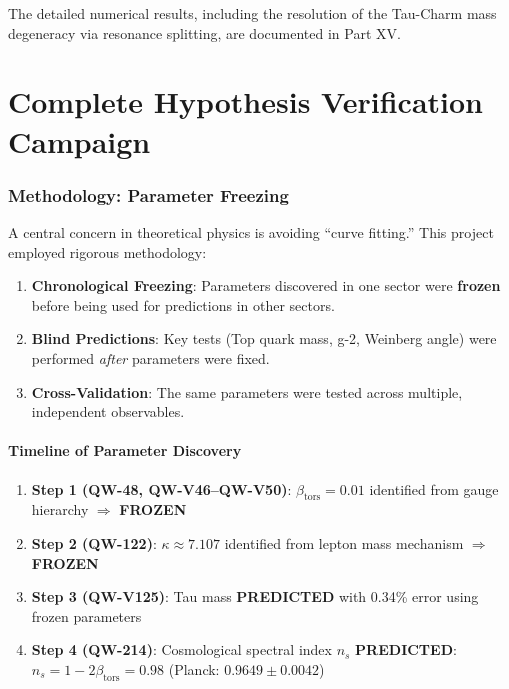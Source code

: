 \documentclass[11pt,a4paper]{book}
\theoremstyle{remark}
\newcommand{\betators}{\beta_{\text{tors}}}
\newcommand{\QW}[1]{\textbf{QW-#1}}
\begin{document}
The detailed numerical results, including the resolution of the Tau-Charm mass degeneracy via resonance splitting, are documented in Part XV.

\newpage
\part{Complete Hypothesis Verification Campaign}

\section{Methodology: Parameter Freezing}

A central concern in theoretical physics is avoiding ``curve fitting.'' This project employed rigorous methodology:

\begin{enumerate}
    \item \textbf{Chronological Freezing}: Parameters discovered in one sector were \textbf{frozen} before being used for predictions in other sectors.
    
    \item \textbf{Blind Predictions}: Key tests (Top quark mass, g-2, Weinberg angle) were performed \textit{after} parameters were fixed.
    
    \item \textbf{Cross-Validation}: The same parameters were tested across multiple, independent observables.
\end{enumerate}

\subsection{Timeline of Parameter Discovery}

\begin{enumerate}
    \item \textbf{Step 1 (\QW{48}, \QW{V46}--\QW{V50})}: $\betators = 0.01$ identified from gauge hierarchy $\Rightarrow$ \textbf{FROZEN}
    
    \item \textbf{Step 2 (\QW{122})}: $\kappa \approx 7.107$ identified from lepton mass mechanism $\Rightarrow$ \textbf{FROZEN}
    
    \item \textbf{Step 3 (\QW{V125})}: Tau mass \textbf{PREDICTED} with 0.34\% error using frozen parameters
    
    \item \textbf{Step 4 (\QW{214})}: Cosmological spectral index $n_s$ \textbf{PREDICTED}: $n_s = 1 - 2\betators = 0.98$ (Planck: $0.9649 \pm 0.0042$)
\end{enumerate}
\end{document}
